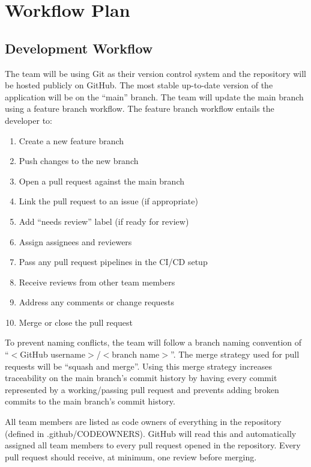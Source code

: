 \documentclass{article}
\begin{document}
\section{Workflow Plan}

\subsection{Development Workflow}

The team will be using Git as their version control system and the repository will be hosted
publicly on GitHub. The most stable up-to-date version of the application will be on the ``main''
branch. The team will update the main branch using a feature branch workflow. The feature branch
workflow entails the developer to:

\begin{enumerate}
	\item Create a new feature branch
	\item Push changes to the new branch
	\item Open a pull request against the main branch
	\item Link the pull request to an issue (if appropriate)
	\item Add ``needs review'' label (if ready for review)
	\item Assign assignees and reviewers
	\item Pass any pull request pipelines in the CI/CD setup
	\item Receive reviews from other team members
	\item Address any comments or change requests
	\item Merge or close the pull request
\end{enumerate}

To prevent naming conflicts, the team will follow a branch naming convention of ``$<$GitHub
username$>$/$<$branch name$>$''. The merge strategy used for pull requests will be ``squash and
merge''. Using this merge strategy increases traceability on the main branch's commit history by
having every commit represented by a working/passing pull request and prevents adding broken
commits to the main branch's commit history.

All team members are listed as code owners of everything in the repository (defined in
.github/CODEOWNERS). GitHub will read this and automatically assigned all team members to every
pull request opened in the repository. Every pull request should receive, at minimum, one review
before merging.
\end{document}
